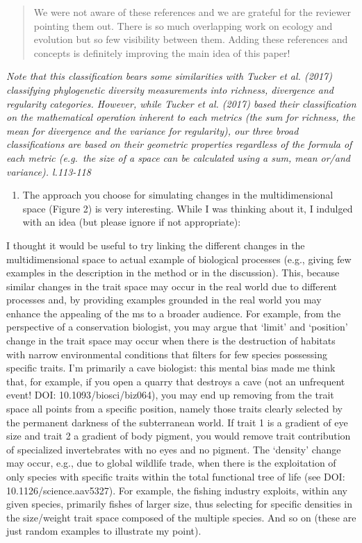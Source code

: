 \documentclass[]{article}
\providecommand{\tightlist}{%
  \setlength{\itemsep}{0pt}\setlength{\parskip}{0pt}}
\begin{document}
\begin{quote}
We were not aware of these references and we are grateful for the
reviewer pointing them out. There is so much overlapping work on ecology
and evolution but so few visibility between them. Adding these
references and concepts is definitely improving the main idea of this
paper!
\end{quote}

\textit{Note that this classification bears some similarities with Tucker et al.
(2017) classifying phylogenetic diversity measurements into richness,
divergence and regularity categories. However, while Tucker et al.
(2017) based their classification on the mathematical operation inherent
to each metrics (the sum for richness, the mean for divergence and the
variance for regularity), our three broad classifications are based on
their geometric properties regardless of the formula of each metric
(e.g.~the size of a space can be calculated using a sum, mean or/and
variance). l.113-118}

\begin{enumerate}
\def\labelenumi{\arabic{enumi})}
\setcounter{enumi}{2}
\tightlist
\item
  The approach you choose for simulating changes in the multidimensional
  space (Figure 2) is very interesting. While I was thinking about it, I
  indulged with an idea (but please ignore if not appropriate):
\end{enumerate}

I thought it would be useful to try linking the different changes in the
multidimensional space to actual example of biological processes (e.g.,
giving few examples in the description in the method or in the
discussion). This, because similar changes in the trait space may occur
in the real world due to different processes and, by providing examples
grounded in the real world you may enhance the appealing of the ms to a
broader audience. For example, from the perspective of a conservation
biologist, you may argue that `limit' and `position' change in the trait
space may occur when there is the destruction of habitats with narrow
environmental conditions that filters for few species possessing
specific traits. I'm primarily a cave biologist: this mental bias made
me think that, for example, if you open a quarry that destroys a cave
(not an unfrequent event! DOI: 10.1093/biosci/biz064), you may end up
removing from the trait space all points from a specific position,
namely those traits clearly selected by the permanent darkness of the
subterranean world. If trait 1 is a gradient of eye size and trait 2 a
gradient of body pigment, you would remove trait contribution of
specialized invertebrates with no eyes and no pigment. The `density'
change may occur, e.g., due to global wildlife trade, when there is the
exploitation of only species with specific traits within the total
functional tree of life (see DOI: 10.1126/science.aav5327). For example,
the fishing industry exploits, within any given species, primarily
fishes of larger size, thus selecting for specific densities in the
size/weight trait space composed of the multiple species. And so on
(these are just random examples to illustrate my point).
\end{document}
